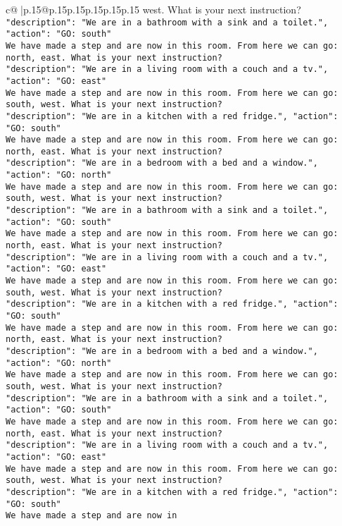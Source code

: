 \documentclass{article}
\begin{document}
{\begin{supertabular}{c@{$\;$}|p{.15\linewidth}@{}p{.15\linewidth}p{.15\linewidth}p{.15\linewidth}p{.15\linewidth}p{.15\linewidth}}
{{{west. What is your next instruction?\\ \tt {"description": "We are in a bathroom with a sink and a toilet.", "action": "GO: south"}\\ \tt We have made a step and are now in this room. From here we can go: north, east. What is your next instruction?\\ \tt {"description": "We are in a living room with a couch and a tv.", "action": "GO: east"}\\ \tt We have made a step and are now in this room. From here we can go: south, west. What is your next instruction?\\ \tt {"description": "We are in a kitchen with a red fridge.", "action": "GO: south"}\\ \tt We have made a step and are now in this room. From here we can go: north, east. What is your next instruction?\\ \tt {"description": "We are in a bedroom with a bed and a window.", "action": "GO: north"}\\ \tt We have made a step and are now in this room. From here we can go: south, west. What is your next instruction?\\ \tt {"description": "We are in a bathroom with a sink and a toilet.", "action": "GO: south"}\\ \tt We have made a step and are now in this room. From here we can go: north, east. What is your next instruction?\\ \tt {"description": "We are in a living room with a couch and a tv.", "action": "GO: east"}\\ \tt We have made a step and are now in this room. From here we can go: south, west. What is your next instruction?\\ \tt {"description": "We are in a kitchen with a red fridge.", "action": "GO: south"}\\ \tt We have made a step and are now in this room. From here we can go: north, east. What is your next instruction?\\ \tt {"description": "We are in a bedroom with a bed and a window.", "action": "GO: north"}\\ \tt We have made a step and are now in this room. From here we can go: south, west. What is your next instruction?\\ \tt {"description": "We are in a bathroom with a sink and a toilet.", "action": "GO: south"}\\ \tt We have made a step and are now in this room. From here we can go: north, east. What is your next instruction?\\ \tt {"description": "We are in a living room with a couch and a tv.", "action": "GO: east"}\\ \tt We have made a step and are now in this room. From here we can go: south, west. What is your next instruction?\\ \tt {"description": "We are in a kitchen with a red fridge.", "action": "GO: south"}\\ \tt We have made a step and are now in }}}
\end{supertabular}}
\end{document}
